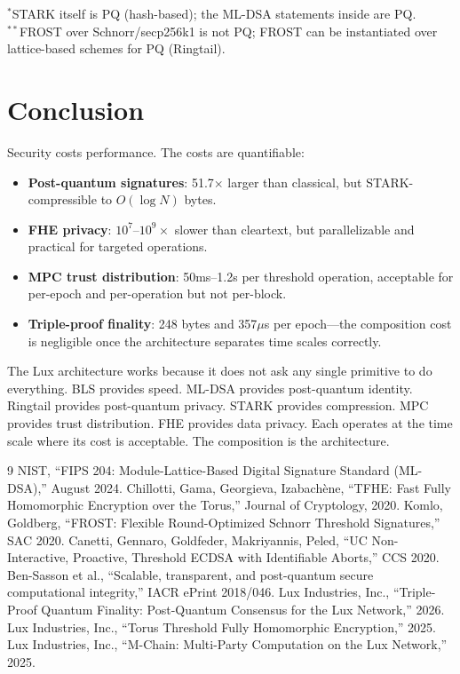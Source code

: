 \documentclass[11pt,a4paper]{article}
\begin{document}
$^*$STARK itself is PQ (hash-based); the ML-DSA statements inside are PQ.\\
$^{**}$FROST over Schnorr/secp256k1 is not PQ; FROST can be instantiated over lattice-based schemes for PQ (Ringtail).

\section{Conclusion}

Security costs performance. The costs are quantifiable:

\begin{itemize}[leftmargin=2em]
\item \textbf{Post-quantum signatures}: 51.7$\times$ larger than classical, but STARK-compressible to $O(\log N)$ bytes.
\item \textbf{FHE privacy}: $10^7$--$10^9\times$ slower than cleartext, but parallelizable and practical for targeted operations.
\item \textbf{MPC trust distribution}: 50ms--1.2s per threshold operation, acceptable for per-epoch and per-operation but not per-block.
\item \textbf{Triple-proof finality}: 248 bytes and 357$\mu$s per epoch---the composition cost is negligible once the architecture separates time scales correctly.
\end{itemize}

The Lux architecture works because it does not ask any single primitive to do everything. BLS provides speed. ML-DSA provides post-quantum identity. Ringtail provides post-quantum privacy. STARK provides compression. MPC provides trust distribution. FHE provides data privacy. Each operates at the time scale where its cost is acceptable. The composition is the architecture.

\begin{thebibliography}{9}
 NIST, ``FIPS 204: Module-Lattice-Based Digital Signature Standard (ML-DSA),'' August 2024.
 Chillotti, Gama, Georgieva, Izabach\`{e}ne, ``TFHE: Fast Fully Homomorphic Encryption over the Torus,'' Journal of Cryptology, 2020.
 Komlo, Goldberg, ``FROST: Flexible Round-Optimized Schnorr Threshold Signatures,'' SAC 2020.
 Canetti, Gennaro, Goldfeder, Makriyannis, Peled, ``UC Non-Interactive, Proactive, Threshold ECDSA with Identifiable Aborts,'' CCS 2020.
 Ben-Sasson et al., ``Scalable, transparent, and post-quantum secure computational integrity,'' IACR ePrint 2018/046.
 Lux Industries, Inc., ``Triple-Proof Quantum Finality: Post-Quantum Consensus for the Lux Network,'' 2026.
 Lux Industries, Inc., ``Torus Threshold Fully Homomorphic Encryption,'' 2025.
 Lux Industries, Inc., ``M-Chain: Multi-Party Computation on the Lux Network,'' 2025.
\end{thebibliography}
\end{document}
